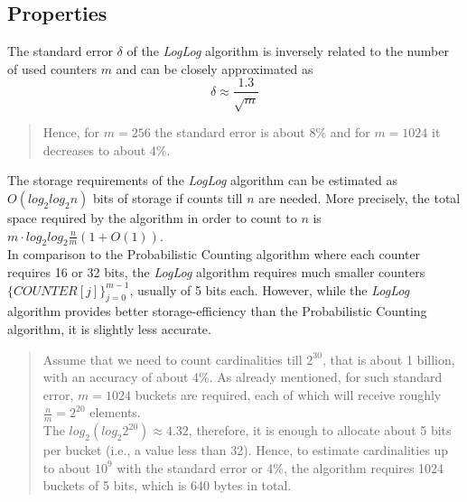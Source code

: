 \documentclass[a4paper,13pt]{article}
\theoremstyle{mytheor}
\begin{document}
\subsection*{Properties}
The standard error $\delta$ of the \textit{LogLog} algorithm is inversely related to
the number of used counters $m$ and can be closely approximated as
\[\delta \approx \frac{1.3}{\sqrt{m}}\]
\vspace{0.25cm}
\begin{quote}
    Hence, for $m = 256$ the standard error is about 8\% and for $m = 1024$ it
    decreases to about 4\%.
    \vspace{0.25cm}
\end{quote}
\vspace{0.25cm}
\indent The storage requirements of the \textit{LogLog} algorithm can be estimated as
$O(log_2log_2n)$ bits of storage if counts till $n$ are needed. More precisely,
the total space required by the algorithm in order to count to $n$ is
$m\cdot log_2log_2\frac{n}{m}(1 + O(1))$.\\
\indent In comparison to the Probabilistic Counting algorithm where each
counter requires 16 or 32 bits, the \textit{LogLog} algorithm requires much
smaller counters $\{COUNTER[j]\}_{j=0}^{m-1}$, usually of 5 bits each. However,
while the \textit{LogLog} algorithm provides better storage-efficiency than
the Probabilistic Counting algorithm, it is slightly less accurate.\\

\begin{quote}
    Assume that we need to count cardinalities till $2^30$, that is about 1 billion,
    with an accuracy of about 4\%. As already mentioned, for such standard
    error, $m = 1024$ buckets are required, each of which will receive roughly
    $\frac{n}{m} = 2^{20}$ elements.\\
    The $log_2\left(log_{2}2^{20}\right) \approx 4.32$, therefore, it is enough to allocate about 5 bits
    per bucket (i.e., a value less than 32). Hence, to estimate cardinalities up
    to about $10^9$ with the standard error or 4\%, the algorithm requires 1024
    buckets of 5 bits, which is 640 bytes in total.
    \vspace{0.25cm}
\end{quote}
\vspace{0.25cm}
\end{document}
